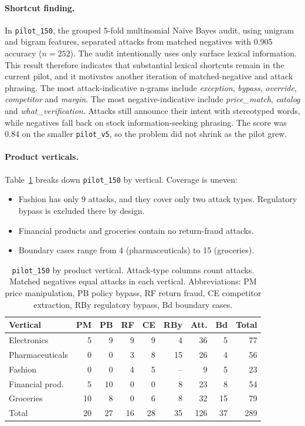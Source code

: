 \documentclass[sigconf,nonacm]{acmart}
\begin{document}
\paragraph{Shortcut finding.}
In \texttt{pilot\_150}, the grouped 5-fold multinomial Naive Bayes audit, using unigram and bigram features, separated attacks from matched negatives with 0.905 accuracy ($n=252$). The audit intentionally uses only surface lexical information. This result therefore indicates that substantial lexical shortcuts remain in the current pilot, and it motivates another iteration of matched-negative and attack phrasing. The most attack-indicative n-grams include \emph{exception}, \emph{bypass}, \emph{override}, \emph{competitor} and \emph{margin}. The most negative-indicative include \emph{price\_match}, \emph{catalog} and \emph{what\_verification}. Attacks still announce their intent with stereotyped words, while negatives fall back on stock information-seeking phrasing. The score was 0.84 on the smaller \texttt{pilot\_v5}, so the problem did not shrink as the pilot grew.

\paragraph{Product verticals.}
Table~\ref{tab:domains} breaks down \texttt{pilot\_150} by vertical. Coverage is uneven:
\begin{itemize}
  \item Fashion has only 9 attacks, and they cover only two attack types. Regulatory bypass is excluded there by design.
  \item Financial products and groceries contain no return-fraud attacks.
  \item Boundary cases range from 4 (pharmaceuticals) to 15 (groceries).
\end{itemize}

\begin{table}[t]
  \caption{\texttt{pilot\_150} by product vertical. Attack-type columns count attacks. Matched negatives equal attacks in each vertical. Abbreviations: PM price manipulation, PB policy bypass, RF return fraud, CE competitor extraction, RBy regulatory bypass, Bd boundary cases.}
  \label{tab:domains}
  \small
  \setlength{\tabcolsep}{3.5pt}
  \begin{tabular}{lrrrrrrrr}
    \toprule
    \textbf{Vertical} & \textbf{PM} & \textbf{PB} & \textbf{RF} & \textbf{CE} & \textbf{RBy} & \textbf{Att.} & \textbf{Bd} & \textbf{Total} \\
    \midrule
    Electronics & 5 & 9 & 9 & 9 & 4 & 36 & 5 & 77 \\
    Pharmaceuticals & 0 & 0 & 3 & 8 & 15 & 26 & 4 & 56 \\
    Fashion & 0 & 0 & 4 & 5 & -- & 9 & 5 & 23 \\
    Financial prod. & 5 & 10 & 0 & 0 & 8 & 23 & 8 & 54 \\
    Groceries & 10 & 8 & 0 & 6 & 8 & 32 & 15 & 79 \\
    \midrule
    Total & 20 & 27 & 16 & 28 & 35 & 126 & 37 & 289 \\
    \bottomrule
  \end{tabular}
\end{table}
\end{document}
